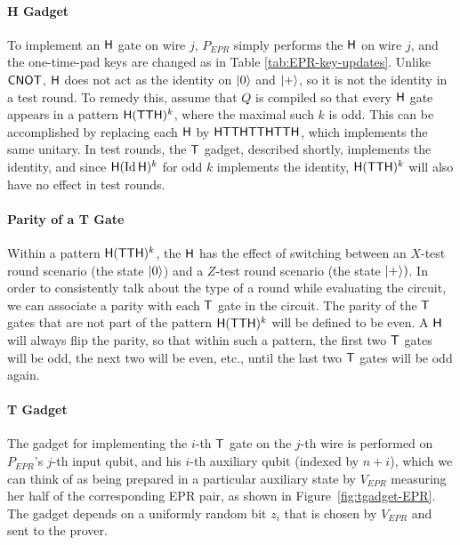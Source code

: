 \paragraph{H Gadget} To implement an $\sf H$ gate on wire $j$, $P_{EPR}$ simply performs the $\sf H$ on wire $j$, and the one-time-pad keys are changed as in Table \ref{tab:EPR-key-updates}. Unlike $\sf CNOT$, $\sf H$ does not act as the identity on $|0\rangle$ and $|+\rangle$, so it is not the identity in a test round. To remedy this, assume that $Q$ is compiled so that every $\sf H$ gate appears in a pattern ${\sf H}({\sf TTH})^k$, where the maximal such $k$ is odd. This can be accomplished by replacing each $\sf H$ by $\sf HTTHTTHTTH$, which implements the same unitary. In test rounds, the $\sf T$ gadget, described shortly, implements the identity, and since ${\sf H}(\mathop{\rm Id}\nolimits {\sf H})^k$ for odd $k$ implements the identity, ${\sf H}({\sf TTH})^k$ will also have no effect in test rounds. 

\paragraph{Parity of a T Gate} Within a pattern ${\sf H}({\sf TTH})^k$, the $\sf H$ has the effect of switching between an $X$-test round scenario (the state $|0\rangle$) and a $Z$-test round scenario (the state $|+\rangle)$. In order to consistently talk about the type of a round while evaluating the circuit, we can associate a parity with each $\sf T$ gate in the circuit. The parity of the $\sf T$ gates that are not part of the pattern ${\sf H}({\sf TTH})^k$ will be defined to be even. A ${\sf H}$ will always flip the parity, so that within such a pattern, the first two ${\sf T}$ gates will be odd, the next two will be even, etc., until the last two $\sf T$ gates will be odd again. 

\paragraph{T Gadget} The gadget for implementing the $i$-th $\sf T$ gate on the $j$-th wire is performed on $P_{EPR}$'s $j$-th input qubit, and his $i$-th auxiliary qubit (indexed by $n+i$), which we can think of as being prepared in a particular auxiliary state by $V_{EPR}$ measuring her half of the corresponding EPR pair, as shown in Figure~\ref{fig:tgadget-EPR}. The gadget depends on a uniformly random bit $z_i$ that is chosen by $V_{EPR}$ and sent to the prover. 



